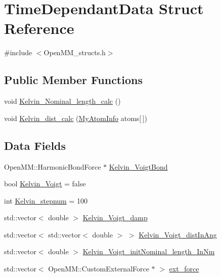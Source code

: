 \hypertarget{structTimeDependantData}{}\section{Time\+Dependant\+Data Struct Reference}
\label{structTimeDependantData}


{\ttfamily \#include $<$Open\+M\+M\+\_\+structs.\+h$>$}

\subsection*{Public Member Functions}
\begin{DoxyCompactItemize}
\item 
void \mbox{\hyperlink{structTimeDependantData_ad7b99aa4390460f002e776d797445152}{Kelvin\+\_\+\+Nominal\+\_\+length\+\_\+calc}} ()
\item 
void \mbox{\hyperlink{structTimeDependantData_a9720506496756bf0604cc83ed1540dcd}{Kelvin\+\_\+dist\+\_\+calc}} (\mbox{\hyperlink{structMyAtomInfo}{My\+Atom\+Info}} atoms\mbox{[}$\,$\mbox{]})
\end{DoxyCompactItemize}
\subsection*{Data Fields}
\begin{DoxyCompactItemize}
\item 
Open\+M\+M\+::\+Harmonic\+Bond\+Force $\ast$ \mbox{\hyperlink{structTimeDependantData_a534577fc9ff214a2c1fa07a7215db475}{Kelvin\+\_\+\+Voigt\+Bond}}
\item 
bool \mbox{\hyperlink{structTimeDependantData_a04750d565dc20a250924f250e77da152}{Kelvin\+\_\+\+Voigt}} = false
\item 
int \mbox{\hyperlink{structTimeDependantData_a8e5d4009bbba02bfeabb746393b9d3e3}{Kelvin\+\_\+stepnum}} = 100
\item 
std\+::vector$<$ double $>$ \mbox{\hyperlink{structTimeDependantData_a47ce75a249b06cfb26bf61f120baa661}{Kelvin\+\_\+\+Voigt\+\_\+damp}}
\item 
std\+::vector$<$ std\+::vector$<$ double $>$ $>$ \mbox{\hyperlink{structTimeDependantData_a2363a9e42a755919f2babda29d61087c}{Kelvin\+\_\+\+Voigt\+\_\+dist\+In\+Ang}}
\item 
std\+::vector$<$ double $>$ \mbox{\hyperlink{structTimeDependantData_ad3e49324aa777171e42e56281a100071}{Kelvin\+\_\+\+Voigt\+\_\+init\+Nominal\+\_\+length\+\_\+\+In\+Nm}}
\item 
std\+::vector$<$ Open\+M\+M\+::\+Custom\+External\+Force $\ast$ $>$ \mbox{\hyperlink{structTimeDependantData_a0ab0b03e54635a5bab1e050fa0fc9abc}{ext\+\_\+force}}
\end{DoxyCompactItemize}


